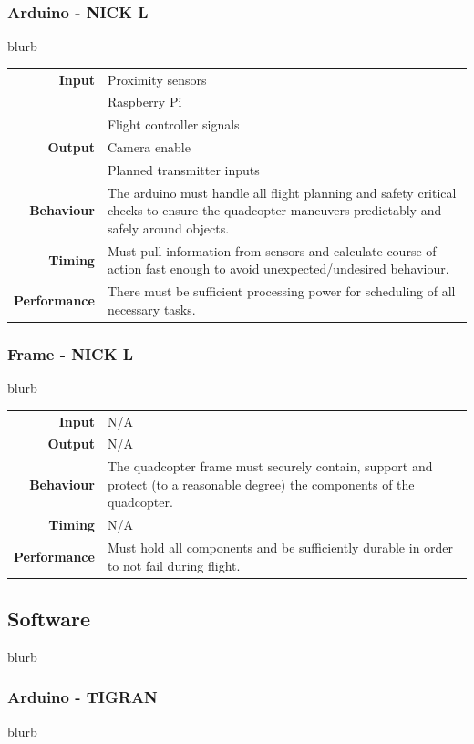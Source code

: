 \documentclass[10pt,letterpaper]{article}
\begin{document}
\subsubsection{Arduino - NICK L}
blurb
\begin{center}
  \begin{tabular}{r p{8.5cm}}
      \textbf{Input} & Proximity sensors \\
      & Raspberry Pi \\
      & Flight controller signals \\
      \textbf{Output} & Camera enable \\
      & Planned transmitter inputs \\
      \textbf{Behaviour} & The arduino must handle all flight planning and safety critical checks to ensure the quadcopter maneuvers predictably and safely around objects. \\
      \textbf{Timing} & Must pull information from sensors and calculate course of action fast enough to avoid unexpected/undesired behaviour. \\
      \textbf{Performance} & There must be sufficient processing power for scheduling of all necessary tasks.
  \end{tabular}
\end{center}

\subsubsection{Frame - NICK L}
blurb
\begin{center}
  \begin{tabular}{r p{8.5cm}}
      \textbf{Input} & N/A \\
      \textbf{Output} & N/A \\
      \textbf{Behaviour} & The quadcopter frame must securely contain, support and protect (to a reasonable degree) the components of the quadcopter. \\
      \textbf{Timing} & N/A \\
      \textbf{Performance} & Must hold all components and be sufficiently durable in order to not fail during flight.
  \end{tabular}
\end{center}


\subsection{Software}
blurb

\subsubsection{Arduino - TIGRAN}
blurb \\
\end{document}
